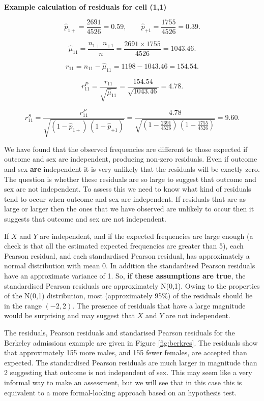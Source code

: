 \documentclass[
  british,
  11pt,
  openany, a4paper]{book}
\begin{document}
\textbf{Example calculation of residuals for cell (1,1)}

\[ \hat{p}_{1+} = \frac{2691}{4526} = 0.59, \qquad \hat{p}_{+1}=\frac{1755}{4526} = 0.39. \]

\[ \hat{\mu}_{11} = \frac{n_{1+}\,n_{+1}}{n} = \frac{2691 \times 1755}{4526} = 1043.46. \]

\[ r_{11} = n_{11}-\hat{\mu}_{11} = 1198 - 1043.46 = 154.54. \]

\[ r_{11}^P = \frac{r_{11}}{\sqrt{\hat{\mu}_{11}}} = \frac{154.54}{\sqrt{1043.46}} = 4.78. \]

\[ r_{11}^S = \frac{r_{11}^P}{\sqrt{(1-\hat{p}_{1+})\,(1-\hat{p}_{+1})}} 
= \frac{4.78}{\sqrt{\left(1-\displaystyle\frac{2691}{4526}\right)\,\left(1-\displaystyle\frac{1755}{4526}\right)}}=9.60. \]

We have found that the observed frequencies are different to those expected if outcome and sex are independent, producing non-zero residuals. Even if outcome and sex \textbf{are} independent it is very unlikely that the residuals will be exactly zero. The question is whether these residuals are so large to suggest that outcome and sex are not independent. To assess this we need to know what kind of residuals tend to occur when outcome and sex are independent. If residuals that are as large or larger then the ones that we have observed are unlikely to occur then it suggests that outcome and sex are not independent.

If \(X\) and \(Y\) are independent, and if the expected frequencies are large enough (a check is that all the estimated expected frequencies are greater than 5), each Pearson residual, and each standardised Pearson residual, has approximately a normal distribution with mean 0. In addition the standardised Pearson residuals have an approximate variance of 1. So, \textbf{if these assumptions are true}, the standardised Pearson residuals are approximately N(0,1). Owing to the properties of the N(0,1) distribution, most (approximately 95\%) of the residuals should lie in the range \((-2, 2)\). The presence of residuals that have a large magnitude would be surprising and may suggest that \(X\) and \(Y\) are not independent.

The residuals, Pearson residuals and standarised Pearson residuals for the Berkeley admissions example are given in Figure \ref{fig:berkres}. The residuals show that approximately 155 more males, and 155 fewer females, are accepted than expected. The standardised Pearson residuals are much larger in magnitude than 2 suggesting that outcome is not independent of sex. This may seem like a very informal way to make an assessment, but we will see that in this case this is equivalent to a more formal-looking approach based on an hypothesis test.
\end{document}
